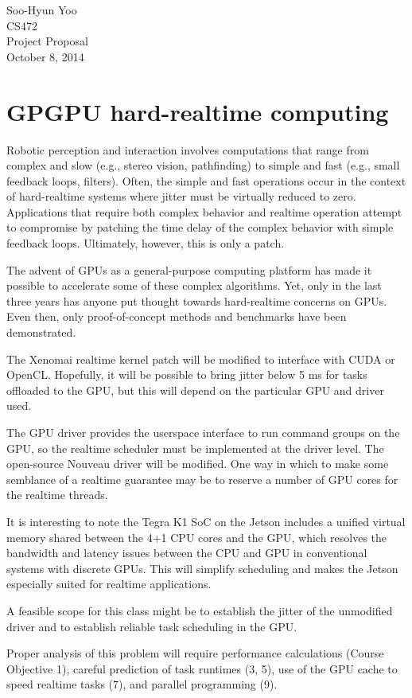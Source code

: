 \documentclass[12pt,letterpaper]{article}
\begin{document}
Soo-Hyun Yoo \\
CS472 \\
Project Proposal \\
October 8, 2014


\section*{GPGPU hard-realtime computing}

Robotic perception and interaction involves computations that range from
complex and slow (e.g., stereo vision, pathfinding) to simple and fast (e.g.,
small feedback loops, filters). Often, the simple and fast operations occur in
the context of hard-realtime systems where jitter must be virtually reduced to
zero. Applications that require both complex behavior and realtime operation
attempt to compromise by patching the time delay of the complex behavior with
simple feedback loops. Ultimately, however, this is only a patch.

The advent of GPUs as a general-purpose computing platform has made it possible
to accelerate some of these complex algorithms. Yet, only in the last three
years has anyone put thought towards hard-realtime concerns on GPUs. Even then,
only proof-of-concept methods and benchmarks have been demonstrated.

The Xenomai realtime kernel patch will be modified to interface with CUDA or
OpenCL. Hopefully, it will be possible to bring jitter below 5 ms for tasks
offloaded to the GPU, but this will depend on the particular GPU and driver
used.

The GPU driver provides the userspace interface to run command groups on the
GPU, so the realtime scheduler must be implemented at the driver level. The
open-source Nouveau driver will be modified. One way in which to make some
semblance of a realtime guarantee may be to reserve a number of GPU cores for
the realtime threads.

It is interesting to note the Tegra K1 SoC on the Jetson includes a unified
virtual memory shared between the 4+1 CPU cores and the GPU, which resolves the
bandwidth and latency issues between the CPU and GPU in conventional systems
with discrete GPUs. This will simplify scheduling and makes the Jetson
especially suited for realtime applications.

A feasible scope for this class might be to establish the jitter of the
unmodified driver and to establish reliable task scheduling in the GPU.

Proper analysis of this problem will require performance calculations (Course
Objective 1), careful prediction of task runtimes (3, 5), use of the GPU cache
to speed realtime tasks (7), and parallel programming (9).
\end{document}
